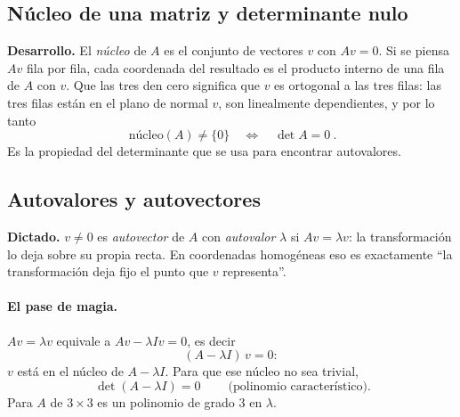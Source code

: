 \subsection{Núcleo de una matriz y determinante nulo}\label{sec:nucleo}

{\small\vspace{1mm}\par}


\textbf{Desarrollo.} El \emph{núcleo} de \(A\) es el conjunto de vectores \(v\) con
\(Av=0\). Si se piensa \(Av\) fila por fila, cada coordenada del resultado es el producto
interno de una fila de \(A\) con \(v\). Que las tres den cero significa que \(v\) es
ortogonal a las tres filas: las tres filas están en el plano de normal \(v\), son linealmente
dependientes, y por lo tanto
\[
  \boxed{\ \text{núcleo}(A)\neq\{0\}\quad\Longleftrightarrow\quad\det A=0\ }.
\]
Es la propiedad del determinante que se usa para encontrar autovalores.

\subsection{Autovalores y autovectores}\label{sec:autovalores}

{\small\vspace{1mm}\par}


\textbf{Dictado.} \(v\neq0\) es \emph{autovector} de \(A\) con \emph{autovalor}
\(\lambda\) si \(Av=\lambda v\): la transformación lo deja sobre su propia recta. En
coordenadas homogéneas eso es exactamente ``la transformación deja fijo el punto que \(v\)
representa''.

\paragraph{El pase de magia.} \(Av=\lambda v\) equivale a \(Av-\lambda Iv=0\), es decir
\[
  (A-\lambda I)\,v=0 :
\]
\(v\) está en el núcleo de \(A-\lambda I\). Para que ese núcleo no sea trivial,
\[
  \boxed{\ \det(A-\lambda I)=0\ }\qquad\text{(polinomio característico)} .
\]
Para \(A\) de \(3\times3\) es un polinomio de grado \(3\) en \(\lambda\).

